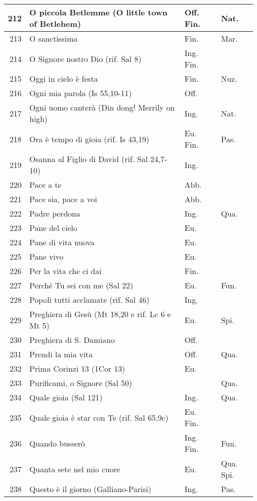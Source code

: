 {\begin{center}
\begin{longtable}{ | r | m{4.7cm} | m{1.8cm} | m{2cm}  |}
    212 & O piccola Betlemme (O little town of Betlehem) & Off. Fin. & Nat.\\ \hline
    213 & O sanctissima & Fin. & Mar.\\ \hline
    214 & O Signore nostro Dio (rif. Sal 8) & Ing. Fin. & \\ \hline
    215 & Oggi in cielo è festa & Fin. & Nuz.\\ \hline
    216 & Ogni mia parola (Is 55,10-11) & Off. & \\ \hline
    217 & Ogni uomo canterà (Din dong! Merrily on high) & Ing. & Nat.\\ \hline
    218 & Ora è tempo di gioia (rif. Is 43,19) & Eu. Fin. & Pas.\\ \hline
    219 & Osanna al Figlio di David (rif. Sal 24,7-10) & Ing. & \\ \hline
    220 & Pace a te & Abb. & \\ \hline
    221 & Pace sia, pace a voi & Abb. & \\ \hline
    222 & Padre perdona & Ing. & Qua.\\ \hline
    223 & Pane del cielo & Eu. & \\ \hline
    224 & Pane di vita nuova & Eu. & \\ \hline
    225 & Pane vivo & Eu. & \\ \hline
    226 & Per la vita che ci dai & Fin. & \\ \hline
    227 & Perché Tu sei con me (Sal 22) & Eu. & Fun.\\ \hline
    228 & Popoli tutti acclamate (rif. Sal 46) & Ing. & \\ \hline
    229 & Preghiera di Gesù (Mt 18,20 e rif. Lc 6 e Mt 5) & Eu. & Spi.\\ \hline
    230 & Preghiera di S. Damiano & Off. & \\ \hline
    231 & Prendi la mia vita & Off. & Qua.\\ \hline
    232 & Prima Corinzi 13 (1Cor 13) & Eu. & \\ \hline
    233 & Purificami, o Signore (Sal 50) &  & Qua.\\ \hline
    234 & Quale gioia (Sal 121) & Ing. & Qua.\\ \hline
    235 & Quale gioia è star con Te (rif. Sal 65,9c) & Eu. Fin. & \\ \hline
    236 & Quando busserò & Ing. Fin. & Fun.\\ \hline
    237 & Quanta sete nel mio cuore & Eu. & Qua. Spi.\\ \hline
    238 & Questo è il giorno (Galliano-Parisi) & Ing. & Pas.\\ \hline

\end{longtable}
\end{center}}
